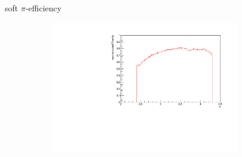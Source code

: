 \documentclass[11pt]{beamer}
\begin{document}
\begin{frame}{soft $\pi$-efficiency}
\begin{figure}
\begin{subfigure}{0.45\textwidth}
\end{subfigure}
\begin{subfigure}{0.45\textwidth}
\includegraphics[width=0.9\textwidth]{up_pdf/single/pos/h_eta_reco_SPi_pos.pdf}
\end{subfigure}
\end{figure}
\end{frame}
\end{document}
